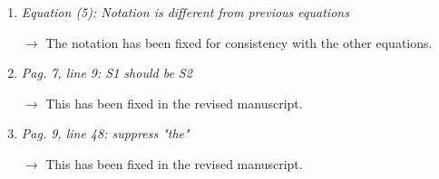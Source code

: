 \documentclass[10pt]{article}
\begin{document}
\begin{enumerate}
\item \emph{Equation (5): Notation is different from previous equations}

$\rightarrow$
The notation has been fixed for consistency with the other equations.

\item \emph{Pag. 7, line 9: S1 should be S2}

$\rightarrow$
This has been fixed in the revised manuscript.

\item \emph{Pag. 9, line 48: suppress "the"}

$\rightarrow$
This has been fixed in the revised manuscript.

\end{enumerate}
\end{document}
